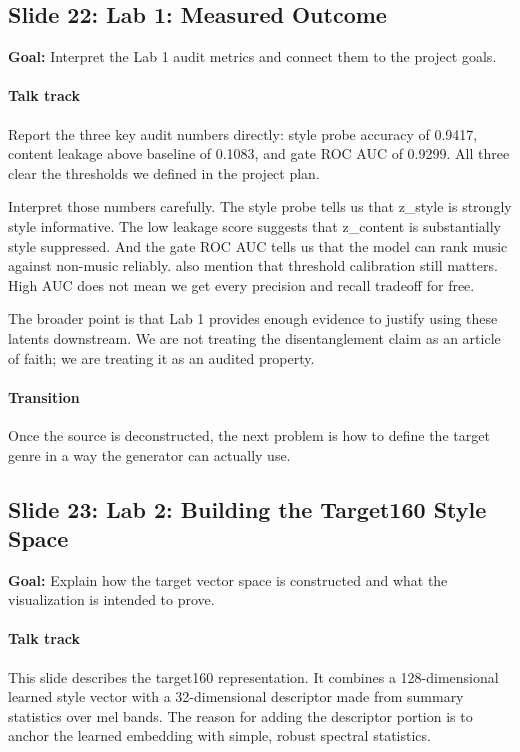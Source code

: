 \documentclass[11pt]{article}
\begin{document}
\subsection*{Slide 22: Lab 1: Measured Outcome}
\textbf{Goal:} Interpret the Lab 1 audit metrics and connect them to the project goals.
\paragraph{Talk track}
Report the three key audit numbers directly: style probe accuracy of 0.9417, content leakage above baseline of 0.1083, and gate ROC AUC of 0.9299. All three clear the thresholds we defined in the project plan.

Interpret those numbers carefully. The style probe tells us that z\_style is strongly style informative. The low leakage score suggests that z\_content is substantially style suppressed. And the gate ROC AUC tells us that the model can rank music against non-music reliably. also mention that threshold calibration still matters. High AUC does not mean we get every precision and recall tradeoff for free.

The broader point is that Lab 1 provides enough evidence to justify using these latents downstream. We are not treating the disentanglement claim as an article of faith; we are treating it as an audited property.

\paragraph{Transition}
Once the source is deconstructed, the next problem is how to define the target genre in a way the generator can actually use.

\subsection*{Slide 23: Lab 2: Building the Target160 Style Space}
\textbf{Goal:} Explain how the target vector space is constructed and what the visualization is intended to prove.
\paragraph{Talk track}
This slide describes the target160 representation. It combines a 128-dimensional learned style vector with a 32-dimensional descriptor made from summary statistics over mel bands. The reason for adding the descriptor portion is to anchor the learned embedding with simple, robust spectral statistics.
\end{document}

